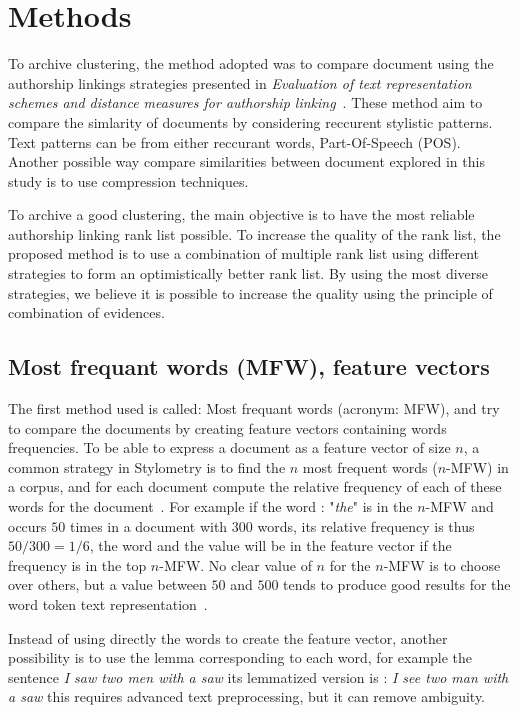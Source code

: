 \section{Methods \label{sec:methods}}

To archive clustering, the method adopted was to compare document using the authorship linkings strategies presented in \textit{Evaluation of text representation schemes and distance measures for authorship linking}~\cite{kocher_verification}.
These method aim to compare the simlarity of documents by considering reccurent stylistic patterns.
Text patterns can be from either reccurant words, Part-Of-Speech (POS).
Another possible way compare similarities between document explored in this study is to use compression techniques.

To archive a good clustering, the main objective is to have the most reliable authorship linking rank list possible.
To increase the quality of the rank list, the proposed method is to use a combination of multiple rank list using different strategies to form an optimistically better rank list.
By using the most diverse strategies, we believe it is possible to increase the quality using the principle of combination of evidences.

\subsection{Most frequant words (MFW), feature vectors}

The first method used is called: Most frequant words (acronym: MFW), and try to compare the documents by creating feature vectors containing words frequencies.
To be able to express a document as a feature vector of size $n$, a common strategy in Stylometry is to find the $n$ most frequent words ($n$-MFW) in a corpus, and for each document compute the relative frequency of each of these words for the document~\cite{savoy_stylo}.
For example if the word : "\textit{the}" is in the $n$-MFW and occurs $50$ times in a document with $300$ words, its relative frequency is thus $50/300 = 1/6$, the word and the value will be in the feature vector if the frequency is in the top $n$-MFW.
No clear value of $n$ for the $n$-MFW is to choose over others, but a value between $50$ and $500$ tends to produce good results for the word token text representation~\cite{savoy_text_representation}.

Instead of using directly the words to create the feature vector, another possibility is to use the lemma corresponding to each word, for example the sentence \textit{I saw two men with a saw} its lemmatized version is : \textit{I see two man with a saw} this requires advanced text preprocessing, but it can remove ambiguity.

